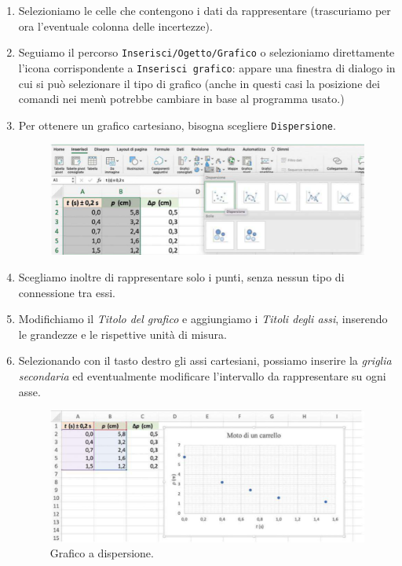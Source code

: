 \documentclass[12pt,a4paper,oneside]{book}
\theoremstyle{esercizio}
\begin{document}
\begin{enumerate}
\item Selezioniamo le celle che contengono i dati da rappresentare
(trascuriamo per ora l'eventuale colonna delle incertezze).
\item Seguiamo il percorso \texttt{Inserisci/Ogetto/Grafico} o selezioniamo
direttamente l'icona corrispondente a \texttt{Inserisci grafico}:
appare una finestra di dialogo in cui si può selezionare il tipo di grafico
(anche in questi casi la posizione dei comandi nei menù potrebbe cambiare in
base al programma usato.)
\item Per ottenere un grafico cartesiano, bisogna scegliere \texttt{Dispersione}.
\begin{figure}[h!]
    \centering
    \includegraphics[scale=0.3]{img/dispersione-libreoffice.png} 
    \caption{}
    \label{fig:disperslo}
\end{figure}
\item Scegliamo inoltre di rappresentare solo i punti, senza nessun  tipo di connessione
tra essi. 
\item Modifichiamo il \textit{Titolo del grafico} e aggiungiamo i \textit{Titoli degli assi},
inserendo le grandezze e le rispettive unità di misura.
\item Selezionando con il tasto destro gli assi cartesiani, possiamo inserire la
\textit{griglia secondaria}  ed eventualmente modificare l'intervallo da 
rappresentare su ogni asse.
\begin{figure}[h!]
    \centering
    \includegraphics[scale=0.3]{img/grafico-libreoffice.png} 
    \caption{Grafico a dispersione.}
    \label{fig:puntilibre}
\end{figure}
\end{enumerate}
\end{document}

